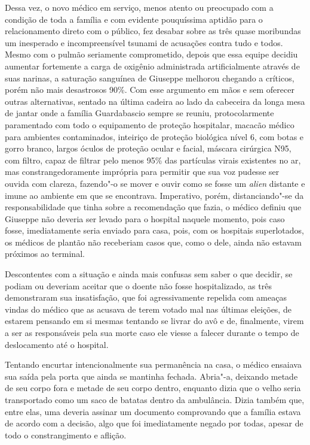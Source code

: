 Dessa vez, o novo médico em serviço, menos atento ou preocupado com a
condição de toda a família e com evidente pouquíssima aptidão para o
relacionamento direto com o público, fez desabar sobre as três quase
moribundas um inesperado e incompreensível tsunami de acusações contra
tudo e todos. Mesmo com o pulmão seriamente comprometido, depois que
essa equipe decidiu aumentar fortemente a carga de oxigênio administrada
artificialmente através de suas narinas, a saturação sanguínea de
Giuseppe melhorou chegando a críticos, porém não mais desastrosos 90\%.
Com esse argumento em mãos e sem oferecer outras alternativas, sentado
na última cadeira ao lado da cabeceira da longa mesa de jantar onde a
família Guardabascio sempre se reuniu, protocolarmente paramentado com
todo o equipamento de proteção hospitalar, macacão médico para ambientes
contaminados, inteiriço de proteção biológica nível 6, com botas e gorro
branco, largos óculos de proteção ocular e facial, máscara cirúrgica
N95, com filtro, capaz de filtrar pelo menos 95\% das partículas virais
existentes no ar, mas constrangedoramente imprópria para permitir que
sua voz pudesse ser ouvida com clareza, fazendo"-o se mover e ouvir como
se fosse um \emph{alien} distante e imune ao ambiente em que se
encontrava. Imperativo, porém, distanciando"-se da responsabilidade que
tinha sobre a recomendação que fazia, o médico definiu que Giuseppe não
deveria ser levado para o hospital naquele momento, pois caso fosse,
imediatamente seria enviado para casa, pois, com os hospitais
superlotados, os médicos de plantão não receberiam casos que, como o
dele, ainda não estavam próximos ao terminal.

Descontentes com a situação e ainda mais confusas sem saber o que
decidir, se podiam ou deveriam aceitar que o doente não fosse
hospitalizado, as três demonstraram sua insatisfação, que foi
agressivamente repelida com ameaças vindas do médico que as acusava de
terem votado mal nas últimas eleições, de estarem pensando em si mesmas
tentando se livrar do avô e de, finalmente, virem a ser as responsáveis
pela sua morte caso ele viesse a falecer durante o tempo de deslocamento
até o hospital.

Tentando encurtar intencionalmente sua permanência na casa, o médico
ensaiava sua saída pela porta que ainda se mantinha fechada. Abria"-a,
deixando metade de seu corpo fora e metade de seu corpo dentro, enquanto
dizia que o velho seria transportado como um saco de batatas dentro da
ambulância. Dizia também que, entre elas, uma deveria assinar um
documento comprovando que a família estava de acordo com a decisão, algo
que foi imediatamente negado por todas, apesar de todo o constrangimento
e aflição.

